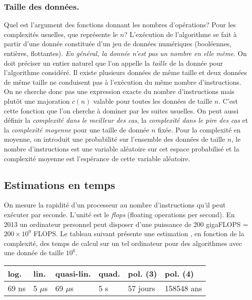 \subsubsection{Taille des données.}
Quel est l'argument des fonctions donnant les nombres d'opérations? Pour les complexités usuelles, que représente le $n$?\newline
L'exécution de l'algorithme se fait à partir d'une donnée constituée d'un jeu de données numériques (booléennes, entières, flottantes). \emph{En général, la donnée n'est pas un nombre en elle même}.\newline
On doit préciser un entier naturel que l'on appelle la \emph{taille} de la donnée pour l'algorithme considéré. Il existe plusieurs données de même taille et deux données de même taille ne conduisent pas à l'exécution du même nombre d'instructions. On ne cherche donc pas une expression exacte du nombre d'instructions mais plutôt une majoration $c(n)$ valable pour toutes les données de taille $n$. C'est cette fonction que l'on cherche à dominer par les suites usuelles. \newline
On peut aussi définir la \emph{complexité dans le meilleur des cas},  la \emph{complexité dans le pire des cas} et la \emph{complexité moyenne} pour une taille de donnée $n$ fixée.\newline
Pour la complexité en moyenne, on introduit une probabilité sur l'ensemble des données de taille $n$, le nombre d'instructions est une variable aléatoire sur cet espace probabilisé et la complexité moyenne est l'espérance de cette variable aléatoire.

\subsection{Estimations en temps}
On mesure la rapidité d'un processeur au nombre d'instructions qu'il peut exécuter par seconde. L'unité est le \emph{flops} (floating operations per second).\newline
En 2013 un ordinateur personnel peut disposer d'une puissance de 200 gigaFLOPS = $200\times 10^{9}$ FLOPS. Le tableau suivant présente une estimation , en fonction de la complexité, des temps de calcul sur un tel ordinateur pour des algorithmes avec une donnée de taille $10^{6}$.
\begin{center}
\renewcommand{\arraystretch}{1.5}
\begin{tabular}{|l|l|l|l|l|l|} \hline
log. & lin. & quasi-lin. & quad. & pol. (3) & pol. (4)\\ \hline
69 ns & 5 $\mu$s & 69 $\mu$s & 5 s & 57 jours & 158548 ans \\ \hline
\end{tabular}
\end{center}


